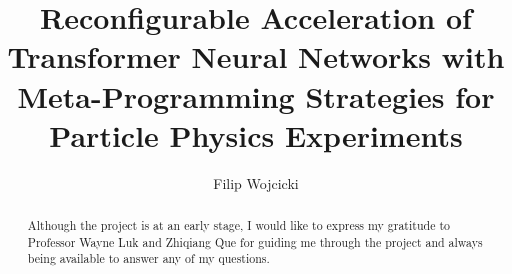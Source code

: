 \documentclass[a4paper, twoside]{report}
\title{Reconfigurable Acceleration of Transformer Neural Networks with Meta-Programming Strategies for Particle Physics Experiments}
\author{Filip Wojcicki}
\begin{document}



\renewcommand{\abstractname}{Acknowledgements}
\begin{abstract}
Although the project is at an early stage, I would like to express my gratitude to Professor Wayne Luk and Zhiqiang Que for guiding me through the project and always being available to answer any of my questions.
\end{abstract}

{\hypersetup{linkcolor=black} \tableofcontents}
\listoffigures
\begingroup %
  \let\clearpage\relax
  \listoftables
\endgroup







% 
% 




\listoftodos[Notes]
\end{document}
